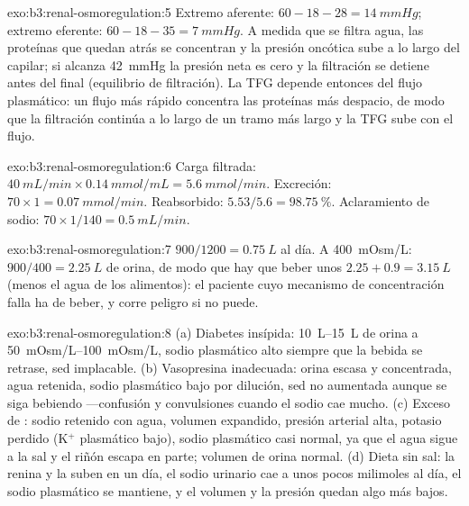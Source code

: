 \begin{solution}{exo:b3:renal-osmoregulation:5}
Extremo aferente: $60 - 18 - 28 = \qty{14}{mmHg}$; extremo eferente: $60 - 18 -
35 = \qty{7}{mmHg}$. A medida que se filtra agua, las proteínas que
quedan atrás se concentran y la presión oncótica sube a lo largo del
capilar; si alcanza \qty{42}{mmHg} la presión neta es cero y la
filtración se detiene antes del final (equilibrio de filtración). La
TFG depende entonces del flujo plasmático: un flujo más rápido
concentra las proteínas más despacio, de modo que la filtración
continúa a lo largo de un tramo más largo y la TFG sube con el flujo.
\end{solution}

\begin{solution}{exo:b3:renal-osmoregulation:6}
Carga filtrada: $\qty{40}{mL/min}\times\qty{0.14}{mmol/mL} =
\qty{5.6}{mmol/min}$. Excreción: $70\times 1 = \qty{0.07}{mmol/min}$.
Reabsorbido: $5.53/5.6 = \qty{98.75}{\%}$. Aclaramiento de sodio: $70\times
1/140 = \qty{0.5}{mL/min}$.
\end{solution}

\begin{solution}{exo:b3:renal-osmoregulation:7}
$900/1200 = \qty{0.75}{L}$ al día. A \qty{400}{mOsm/L}: $900/400 =
\qty{2.25}{L}$ de orina, de modo que hay que beber unos
$2.25 + 0.9 = \qty{3.15}{L}$ (menos el agua de los alimentos): el
paciente cuyo mecanismo de concentración falla ha de beber, y corre
peligro si no puede.
\end{solution}

\begin{solution}{exo:b3:renal-osmoregulation:8}
(a) Diabetes insípida: \qtyrange{10}{15}{L} de orina a
\qtyrange{50}{100}{mOsm/L}, sodio plasmático alto siempre que la bebida
se retrase, sed implacable. (b) Vasopresina inadecuada: orina escasa y
concentrada, agua retenida, sodio plasmático bajo por dilución, sed no
aumentada aunque se siga bebiendo ---confusión y convulsiones cuando el
sodio cae mucho. (c) Exceso de : sodio retenido con agua,
volumen expandido, presión arterial alta, potasio perdido (K$^{+}$
plasmático bajo), sodio plasmático casi normal, ya que el agua sigue a
la sal y el riñón escapa en parte; volumen de orina normal. (d) Dieta
sin sal: la renina y la  suben en un día, el sodio urinario
cae a unos pocos milimoles al día, el sodio plasmático se mantiene, y
el volumen y la presión quedan algo más bajos.
\end{solution}

